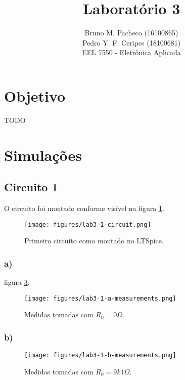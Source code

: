 \documentclass[a4paper]{report}
\begin{document}
 
\title{Laboratório 3}
\author{Bruno M. Pacheco (16100865)\\
Pedro Y. F. Ceripes (18100681) \\
EEL 7550 - Eletrônica Aplicada}
 
\maketitle

\section*{Objetivo}
 
TODO
 
\section*{Simulações}

\subsection*{Circuito 1}

O circuito foi montado conforme visível na figura \ref{fig:figures-lab3-1-circuit-png}.

\begin{figure}[H]
    \centering
    \texttt{[image: figures/lab3-1-circuit.png]}
    \caption{Primeiro circuito como montado no LTSpice.}
    \label{fig:figures-lab3-1-circuit-png}
\end{figure}

\subsubsection*{a)}

figura \ref{fig:figures-lab3-1-a-measurements-png}.

\begin{figure}[H]
    \centering
    \texttt{[image: figures/lab3-1-a-measurements.png]}
    \caption{Medidas tomadas com $R_0=0 \Omega$.}
    \label{fig:figures-lab3-1-a-measurements-png}
\end{figure}

\subsubsection*{b)}


\begin{figure}[H]
    \centering
    \texttt{[image: figures/lab3-1-b-measurements.png]}
    \caption{Medidas tomadas com $R_0=9k1 \Omega$.}
    \label{fig:figures-lab3-1-a-measurements-png}
\end{figure}
\end{document}
